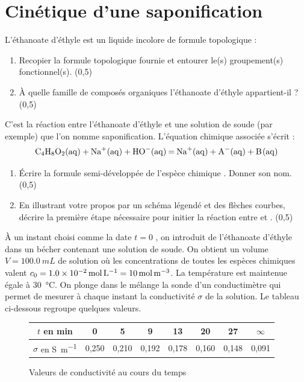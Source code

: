 \documentclass[a4paper,12pt,fleqn]{article}%
\begin{document}
\maketitle
\section{Cinétique d'une saponification}
L'éthanoate d'éthyle est un liquide incolore de formule topologique :
\begin{enumerate}
    \item Recopier la formule topologique fournie et entourer le(s) groupement(s) fonctionnel(s). (0,5)
    \item À quelle famille de composés organiques l'éthanoate d'éthyle appartient-il ? (0,5)
\end{enumerate}

C'est la réaction entre l'éthanoate d'éthyle et une solution de soude (par exemple) que l'on nomme saponification. L'équation chimique associée s'écrit : $$\ce{C4H8O2(aq) + Na+(aq) + HO-(aq) = Na+(aq) + A-(aq) + B(aq)}$$

\begin{enumerate}[resume]
    \item Écrire la formule semi-développée de l'espèce chimique . Donner son nom. (0,5)
    \item En illustrant votre propos par un schéma légendé et des flèches courbes, décrire la première étape nécessaire pour initier la réaction entre  et . (0,5)
\end{enumerate}

À un instant choisi comme la date $t=0$ , on introduit de l'éthanoate d'éthyle dans un bécher contenant une solution de soude. On obtient un volume $V = \SI{100,0}{mL}$ de solution où les concentrations de toutes les espèces chimiques valent $c_0 = \SI{1,0E-2}{\mole\per\liter} = \SI{10}{\mole\per\meter\cubed}$. La température est maintenue égale à \SI{30}{\celsius}. On plonge dans le mélange la sonde d'un conductimètre qui permet de mesurer à chaque instant la conductivité $\sigma$ de la solution. Le tableau ci-dessous regroupe quelques valeurs.

\begin{figure}[h!]
    \centering
    \begin{tabular}{|c|c|c|c|c|c|c|c|}
    \hline
        $t$ en \unit{\minute} & 0 & 5 & 9 & 13 & 20 & 27 & $\infty$\\
        \hline
        $\sigma$ en \unit{\siemens\per\meter} & 0,250 & 0,210 & 0,192 & 0,178 & 0,160 & 0,148 & 0,091\\
        \hline
    \end{tabular}
    \caption{Valeurs de conductivité au cours du temps}
    \label{fig1}
\end{figure}
\end{document}
